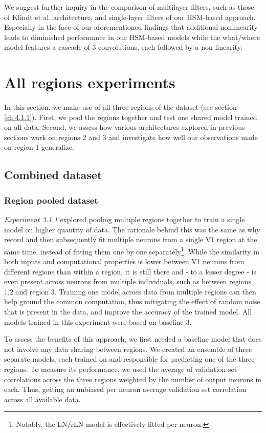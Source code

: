We suggest further inquiry in the comparison of multilayer filters, such as those of Klindt et al. architecture, and single-layer filters of our HSM-based approach. Especially in the face of our aforementioned findings that additional nonlinearity leads to diminished performance in our HSM-based models while the what/where model features a cascade of 3 convolutions, each followed by a non-linearity. 

\section{All regions experiments}

In this section, we make use of all three regions of the dataset (see section \ref{ch:4.1.1}). First, we pool the regions together and test one shared model trained on all data. Second, we assess how various architectures explored in previous sections work on regions 2 and 3 and investigate how well our observations made on region 1 generalize.

\subsection{Combined dataset}\label{ch:5.3.1}
\subsubsection{Region pooled dataset}

\textit{Experiment 3.1.1} explored pooling multiple regions together to train a single model on higher quantity of data. The rationale behind this was the same as why record and then subsequently fit multiple neurons from a single V1 region at the same time, instead of fitting them one by one separately\footnote{Notably, the LN/rLN model is effectively fitted per neuron.}. While the similarity in both inputs and computational properties is lower between V1 neurons from different regions than within a region, it is still there and - to a lesser degree - is even present across neurons from multiple individuals, such as between regions 1,2 and region 3. Training one model across data from multiple regions can then help ground the common computation, thus mitigating the effect of random noise that is present in the data, and improve the accuracy of the trained model. All models trained in this experiment were based on baseline 3. 

To assess the benefits of this approach, we first needed a baseline model that does not involve any data sharing between regions. We created an ensemble of three separate models, each trained on and responsible for predicting one of the three regions. To measure its performance, we used the average of validation set correlations across the three regions weighted by the number of output neurons in each. Thus, getting an unbiased per neuron average validation set correlation across all available data.

